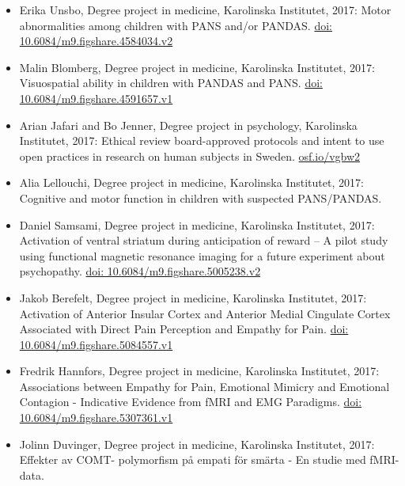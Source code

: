 \documentclass[10pt,a4paper,twocolumn]{article}
\begin{document}
\begin{itemize}
\begin{itemize}
        \item Erika Unsbo, Degree project in medicine, Karolinska Institutet, 2017: Motor abnormalities among children with PANS and/or PANDAS. \href{https://doi.org/10.6084/m9.figshare.4584034.v2}{doi: 10.6084/m9.figshare.4584034.v2}

        \item Malin Blomberg, Degree project in medicine, Karolinska Institutet, 2017: Visuospatial ability in children with PANDAS and PANS. \href{https://doi.org/10.6084/m9.figshare.4591657.v1}{doi: 10.6084/m9.figshare.4591657.v1}

        \item Arian Jafari and Bo Jenner, Degree project in psychology, Karolinska Institutet, 2017: Ethical review board-approved protocols and intent to use open practices in research on human subjects in Sweden. \href{https://osf.io/vgbw2}{osf.io/vgbw2}

        \item Alia Lellouchi, Degree project in medicine, Karolinska Institutet, 2017: Cognitive and motor function in children with suspected PANS/PANDAS.

        \item Daniel Samsami, Degree project in medicine, Karolinska Institutet, 2017: Activation of ventral striatum during anticipation of reward – A pilot study using functional magnetic resonance imaging for a future experiment about psychopathy. \href{https://doi.org/10.6084/m9.figshare.5005238.v2}{doi: 10.6084/m9.figshare.5005238.v2}

        \item Jakob Berefelt, Degree project in medicine, Karolinska Institutet, 2017: Activation of Anterior Insular Cortex and Anterior Medial Cingulate Cortex Associated with Direct Pain Perception and Empathy for Pain. \href{https://doi.org/10.6084/m9.figshare.5084557.v1}{doi: 10.6084/m9.figshare.5084557.v1}

        \item Fredrik Hannfors, Degree project in medicine, Karolinska Institutet, 2017: Associations between Empathy for Pain, Emotional Mimicry and Emotional Contagion - Indicative Evidence from fMRI and EMG Paradigms. \href{https://doi.org/10.6084/m9.figshare.5307361.v1}{doi: 10.6084/m9.figshare.5307361.v1}

        \item Jolinn Duvinger, Degree project in medicine, Karolinska Institutet, 2017: Effekter av COMT- polymorfism på empati för smärta - En studie med fMRI-data.


\end{itemize}
\end{itemize}
\end{document}
